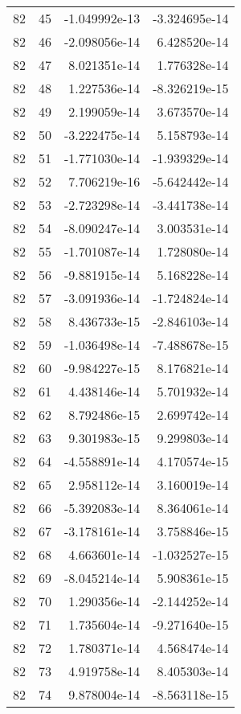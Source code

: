 \begin{tabular}{rrrr}
  82 &   45 & -1.049992e-13 & -3.324695e-14 \\
  82 &   46 & -2.098056e-14 &  6.428520e-14 \\
  82 &   47 &  8.021351e-14 &  1.776328e-14 \\
  82 &   48 &  1.227536e-14 & -8.326219e-15 \\
  82 &   49 &  2.199059e-14 &  3.673570e-14 \\
  82 &   50 & -3.222475e-14 &  5.158793e-14 \\
  82 &   51 & -1.771030e-14 & -1.939329e-14 \\
  82 &   52 &  7.706219e-16 & -5.642442e-14 \\
  82 &   53 & -2.723298e-14 & -3.441738e-14 \\
  82 &   54 & -8.090247e-14 &  3.003531e-14 \\
  82 &   55 & -1.701087e-14 &  1.728080e-14 \\
  82 &   56 & -9.881915e-14 &  5.168228e-14 \\
  82 &   57 & -3.091936e-14 & -1.724824e-14 \\
  82 &   58 &  8.436733e-15 & -2.846103e-14 \\
  82 &   59 & -1.036498e-14 & -7.488678e-15 \\
  82 &   60 & -9.984227e-15 &  8.176821e-14 \\
  82 &   61 &  4.438146e-14 &  5.701932e-14 \\
  82 &   62 &  8.792486e-15 &  2.699742e-14 \\
  82 &   63 &  9.301983e-15 &  9.299803e-14 \\
  82 &   64 & -4.558891e-14 &  4.170574e-15 \\
  82 &   65 &  2.958112e-14 &  3.160019e-14 \\
  82 &   66 & -5.392083e-14 &  8.364061e-14 \\
  82 &   67 & -3.178161e-14 &  3.758846e-15 \\
  82 &   68 &  4.663601e-14 & -1.032527e-15 \\
  82 &   69 & -8.045214e-14 &  5.908361e-15 \\
  82 &   70 &  1.290356e-14 & -2.144252e-14 \\
  82 &   71 &  1.735604e-14 & -9.271640e-15 \\
  82 &   72 &  1.780371e-14 &  4.568474e-14 \\
  82 &   73 &  4.919758e-14 &  8.405303e-14 \\
  82 &   74 &  9.878004e-14 & -8.563118e-15 \\

\end{tabular}
